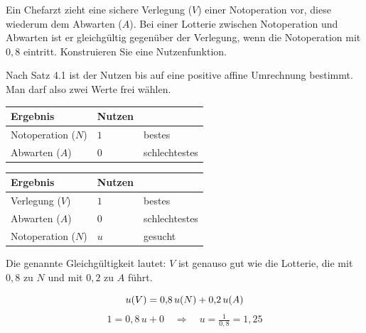 \begin{aufgabe}
Ein Chefarzt zieht eine sichere Verlegung ($V$) einer Notoperation vor, diese wiederum dem Abwarten ($A$). Bei einer Lotterie zwischen Notoperation und Abwarten ist er gleichgültig gegenüber der Verlegung, wenn die Notoperation mit $0{,}8$ eintritt. Konstruieren Sie eine Nutzenfunktion.

\loesung
{}
Nach Satz 4.1 ist der Nutzen bis auf eine positive affine Umrechnung bestimmt. Man darf also zwei Werte frei wählen.

\begin{center}
\renewcommand{\arraystretch}{1.48}
\begin{tabular}{@{}P{2.6cm}P{2.0cm}P{2.6cm}@{}}
\toprule
\textbf{Ergebnis} & \textbf{Nutzen} & \\
\midrule
Notoperation ($N$) & $1$ & bestes\\
Abwarten ($A$) & $0$ & schlechtestes\\
\bottomrule
\end{tabular}
\end{center}

\begin{center}
\begin{minipage}{0.86\textwidth}
\end{minipage}
\end{center}

\begin{center}
\renewcommand{\arraystretch}{1.48}
\begin{tabular}{@{}P{2.6cm}P{2.0cm}P{2.6cm}@{}}
\toprule
\textbf{Ergebnis} & \textbf{Nutzen} & \\
\midrule
Verlegung ($V$) & $1$ & bestes\\
Abwarten ($A$) & $0$ & schlechtestes\\
Notoperation ($N$) & $u$ & gesucht\\
\bottomrule
\end{tabular}
\end{center}

Die genannte Gleichgültigkeit lautet: $V$ ist genauso gut wie die Lotterie, die mit $0{,}8$ zu $N$ und mit $0{,}2$ zu $A$ führt.

\[ u(V) = 0{,}8\,u(N) + 0{,}2\,u(A) \]
\[ 1 = 0{,}8\,u + 0 \quad\Longrightarrow\quad u = \tfrac{1}{0{,}8} = 1{,}25 \]


\end{aufgabe}

